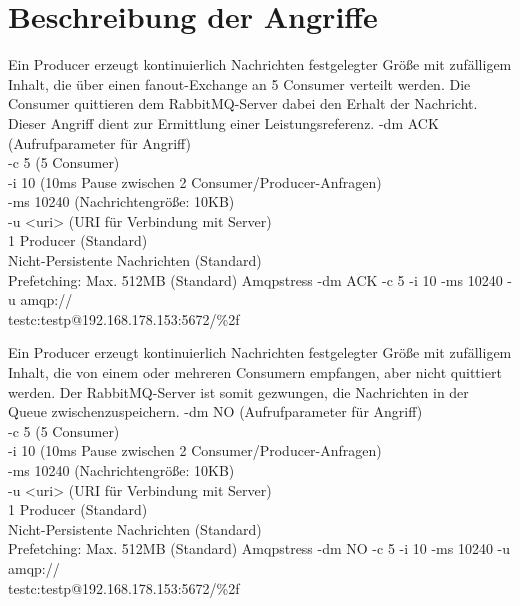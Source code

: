 \documentclass[	a4paper,
			11pt,
			oneside,
			parskip]{scrartcl}
\begin{document}
%	
%
\clearpage
\section*{Beschreibung der Angriffe}

		{%
		 Ein Producer erzeugt kontinuierlich Nachrichten festgelegter Größe mit zufälligem Inhalt, die über einen \glqq fanout\grqq-Exchange an 5 Consumer verteilt werden. Die Consumer quittieren dem RabbitMQ-Server dabei den Erhalt der Nachricht. 
		 Dieser Angriff dient zur Ermittlung einer Leistungsreferenz.
		}{%
		 -dm ACK (Aufrufparameter für Angriff) \\
		 -c 5 (5 Consumer) \\
		 -i 10 (10ms Pause zwischen 2 Consumer/Producer-Anfragen) \\
		 -ms 10240 (Nachrichtengröße: 10KB) \\
		 -u <uri> (URI für Verbindung mit Server) \\
		 1 Producer (Standard) \\
		 Nicht-Persistente Nachrichten (Standard) \\
		 Prefetching: Max. 512MB (Standard)
		}{%
		 Amqpstress -dm ACK -c 5 -i 10 -ms 10240 -u amqp://\\\hspace*{3cm}testc:testp@192.168.178.153:5672/\%2f
		}


		{%
		 Ein Producer erzeugt kontinuierlich Nachrichten festgelegter Größe mit zufälligem Inhalt, die von einem oder mehreren Consumern empfangen, aber nicht quittiert werden.
		 Der RabbitMQ-Server ist somit gezwungen, die Nachrichten in der Queue zwischenzuspeichern.
		}{%
		 -dm NO (Aufrufparameter für Angriff) \\
		 -c 5 (5 Consumer) \\
		 -i 10 (10ms Pause zwischen 2 Consumer/Producer-Anfragen) \\
		 -ms 10240 (Nachrichtengröße: 10KB) \\
		 -u <uri> (URI für Verbindung mit Server) \\
		 1 Producer (Standard) \\
		 Nicht-Persistente Nachrichten (Standard) \\
		 Prefetching: Max. 512MB (Standard) 
		}{%
		 Amqpstress -dm NO -c 5 -i 10 -ms 10240 -u amqp://\\\hspace*{3cm}testc:testp@192.168.178.153:5672/\%2f
		}
\end{document}
